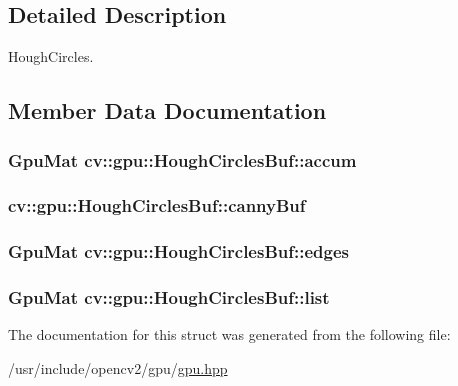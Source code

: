 \subsection{Detailed Description}
Hough\-Circles. 

\subsection{Member Data Documentation}
\hypertarget{structcv_1_1gpu_1_1HoughCirclesBuf_a00fe9ce2a71b3d02060b9a97cb1cb2f3}{
\subsubsection[{accum}]{\setlength{\rightskip}{0pt plus 5cm}Gpu\-Mat cv\-::gpu\-::\-Hough\-Circles\-Buf\-::accum}}\label{structcv_1_1gpu_1_1HoughCirclesBuf_a00fe9ce2a71b3d02060b9a97cb1cb2f3}
\hypertarget{structcv_1_1gpu_1_1HoughCirclesBuf_aa90bedc09cd2eba166b1883108a86541}{
\subsubsection[{canny\-Buf}]{ cv\-::gpu\-::\-Hough\-Circles\-Buf\-::canny\-Buf}}\label{structcv_1_1gpu_1_1HoughCirclesBuf_aa90bedc09cd2eba166b1883108a86541}
\hypertarget{structcv_1_1gpu_1_1HoughCirclesBuf_ab839c1e51739fc2c5bd358828b39bcbd}{
\subsubsection[{edges}]{\setlength{\rightskip}{0pt plus 5cm}Gpu\-Mat cv\-::gpu\-::\-Hough\-Circles\-Buf\-::edges}}\label{structcv_1_1gpu_1_1HoughCirclesBuf_ab839c1e51739fc2c5bd358828b39bcbd}
\hypertarget{structcv_1_1gpu_1_1HoughCirclesBuf_ab2ea2af56aca0f063bbfe8434d462a76}{
\subsubsection[{list}]{\setlength{\rightskip}{0pt plus 5cm}Gpu\-Mat cv\-::gpu\-::\-Hough\-Circles\-Buf\-::list}}\label{structcv_1_1gpu_1_1HoughCirclesBuf_ab2ea2af56aca0f063bbfe8434d462a76}


The documentation for this struct was generated from the following file\-:\begin{DoxyCompactItemize}
\item 
/usr/include/opencv2/gpu/\hyperlink{gpu_2gpu_8hpp}{gpu.\-hpp}\end{DoxyCompactItemize}
